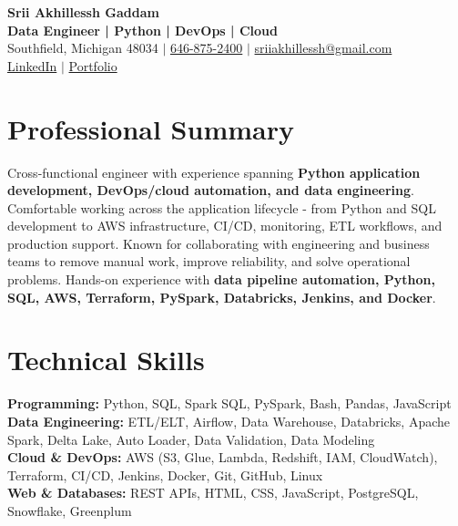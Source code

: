 \documentclass[letterpaper,10pt]{article}
\begin{document}
\fontsize{9.35pt}{10.45pt}\selectfont

\begin{center}
    {\LARGE \textbf{Srii Akhillessh Gaddam}} \\[-1pt]
    \textbf{Data Engineer | Python | DevOps | Cloud} \\[2pt]
    Southfield, Michigan 48034 $|$
    \href{tel:6468752400}{646-875-2400} $|$
    \href{mailto:sriiakhillessh@gmail.com}{sriiakhillessh@gmail.com} \\[1pt]
    \href{https://www.linkedin.com/in/srii-akhiilessh-gaddam-b48668191/}{LinkedIn} $|$
    \href{https://sriiakhillesshg.github.io/portfolio/}{Portfolio}
\end{center}
\vspace{-8pt}

\section{Professional Summary}
\small{Cross-functional engineer with experience spanning \textbf{Python application development, DevOps/cloud automation, and data engineering}. Comfortable working across the application lifecycle - from Python and SQL development to AWS infrastructure, CI/CD, monitoring, ETL workflows, and production support. Known for collaborating with engineering and business teams to remove manual work, improve reliability, and solve operational problems. Hands-on experience with \textbf{data pipeline automation, Python, SQL, AWS, Terraform, PySpark, Databricks, Jenkins, and Docker}.}

\section{Technical Skills}
\small{
\textbf{Programming:} Python, SQL, Spark SQL, PySpark, Bash, Pandas, JavaScript \\
\textbf{Data Engineering:} ETL/ELT, Airflow, Data Warehouse, Databricks, Apache Spark, Delta Lake, Auto Loader, Data Validation, Data Modeling \\
\textbf{Cloud \& DevOps:} AWS (S3, Glue, Lambda, Redshift, IAM, CloudWatch), Terraform, CI/CD, Jenkins, Docker, Git, GitHub, Linux \\
\textbf{Web \& Databases:} REST APIs, HTML, CSS, JavaScript, PostgreSQL, Snowflake, Greenplum
}
\end{document}
